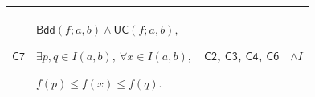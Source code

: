 \documentclass[11pt]{amsart}
\newlength{\FTCFourColumnBody}
\begin{document}
{\begin{tabular}
\end{tabular}%
\par\setlength{\parskip}{0pt}\nointerlineskip
\noindent
\begin{tabular}{|@{}>{\centering\arraybackslash}m{0.078431\FTCFourColumnBody}|>{\centering\arraybackslash}m{0.535947\FTCFourColumnBody}|>{\centering\arraybackslash}m{0.281045\FTCFourColumnBody}|>{\centering\arraybackslash}m{0.104575\FTCFourColumnBody}|}\hline
\hypertarget{proof:C7}{$\displaystyle \textsf{C7}$} & $\displaystyle \textsf{Bdd}(f;a,b)\land\textsf{UC}(f;a,b),$\par
$\displaystyle \exists p,q\in I(a,b),\ \forall x\in I(a,b),$\par
$\displaystyle f(p)\le f(x)\le f(q).$ & \hyperlink{proof:C2}{$\displaystyle \textsf{C2}$}, \hyperlink{proof:C3}{$\displaystyle \textsf{C3}$}, \hyperlink{proof:C4}{$\displaystyle \textsf{C4}$}, \hyperlink{proof:C6}{$\displaystyle \textsf{C6}$} & $\displaystyle \land I$\\ \hline
\end{tabular}%
\par
}
\end{document}

